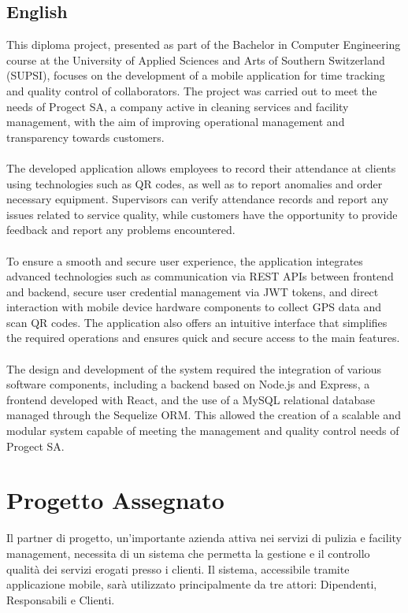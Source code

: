 \documentclass[twoside]{supsistudent}
\begin{document}
\section*{English}
This diploma project, presented as part of the Bachelor in Computer Engineering course at the University of Applied Sciences and Arts of Southern Switzerland (SUPSI), focuses on the development of a mobile application for time tracking and quality control of collaborators. The project was carried out to meet the needs of Progect SA, a company active in cleaning services and facility management, with the aim of improving operational management and transparency towards customers.
\\\\
The developed application allows employees to record their attendance at clients using technologies such as QR codes, as well as to report anomalies and order necessary equipment. Supervisors can verify attendance records and report any issues related to service quality, while customers have the opportunity to provide feedback and report any problems encountered.
\\\\
To ensure a smooth and secure user experience, the application integrates advanced technologies such as communication via REST APIs between frontend and backend, secure user credential management via JWT tokens, and direct interaction with mobile device hardware components to collect GPS data and scan QR codes. The application also offers an intuitive interface that simplifies the required operations and ensures quick and secure access to the main features.
\\\\
The design and development of the system required the integration of various software components, including a backend based on Node.js and Express, a frontend developed with React, and the use of a MySQL relational database managed through the Sequelize ORM. This allowed the creation of a scalable and modular system capable of meeting the management and quality control needs of Progect SA.

\chapter{Progetto Assegnato}

Il partner di progetto, un'importante azienda attiva nei servizi di pulizia e facility management, necessita di un sistema che permetta la gestione e il controllo qualità dei servizi erogati presso i clienti. Il sistema, accessibile tramite applicazione mobile, sarà utilizzato principalmente da tre attori: Dipendenti, Responsabili e Clienti.
\end{document}
